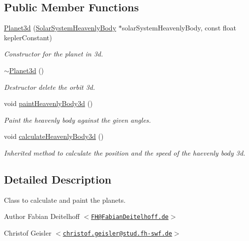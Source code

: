 \subsection*{\-Public \-Member \-Functions}
\begin{DoxyCompactItemize}
\item 
\hyperlink{classPlanet3d_ad657ee6cddb3f386e861dad977f6998c}{\-Planet3d} (\hyperlink{classSolarSystemHeavenlyBody}{\-Solar\-System\-Heavenly\-Body} $\ast$solar\-System\-Heavenly\-Body, const float kepler\-Constant)
\begin{DoxyCompactList}\small\item\em \-Constructor for the planet in 3d. \end{DoxyCompactList}\item 
\hyperlink{classPlanet3d_aecd84d1043acd76bebc3314f14643280}{$\sim$\-Planet3d} ()
\begin{DoxyCompactList}\small\item\em \-Destructor delete the orbit 3d. \end{DoxyCompactList}\item 
void \hyperlink{classPlanet3d_a2e504935919360a2015b50c103798dd8}{paint\-Heavenly\-Body3d} ()
\begin{DoxyCompactList}\small\item\em \-Paint the heavenly body against the given angles. \end{DoxyCompactList}\item 
void \hyperlink{classPlanet3d_af486055f2af946f84c309c93096596fd}{calculate\-Heavenly\-Body3d} ()
\begin{DoxyCompactList}\small\item\em \-Inherited method to calculate the position and the speed of the haevenly body 3d. \end{DoxyCompactList}\end{DoxyCompactItemize}


\subsection{\-Detailed \-Description}
\-Class to calculate and paint the planets.

\begin{DoxyAuthor}{\-Author}
\-Fabian \-Deitelhoff $<$\href{mailto:FH@FabianDeitelhoff.de}{\tt \-F\-H@\-Fabian\-Deitelhoff.\-de}$>$ 

\-Christof \-Geisler $<$\href{mailto:christof.geisler@stud.fh-swf.de}{\tt christof.\-geisler@stud.\-fh-\/swf.\-de}$>$ 
\end{DoxyAuthor}


